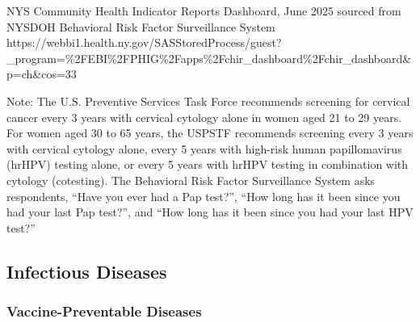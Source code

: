 \documentclass[
  english,
  letterpaper,
]{report}
\begin{document}
\begin{tcolorbox}[enhanced jigsaw, breakable, leftrule=.75mm, title=\textcolor{quarto-callout-note-color}{\faInfo}\hspace{0.5em}{Source}, bottomrule=.15mm, opacityback=0, left=2mm, colback=white, bottomtitle=1mm, coltitle=black, colbacktitle=quarto-callout-note-color!10!white, colframe=quarto-callout-note-color-frame, opacitybacktitle=0.6, toptitle=1mm, titlerule=0mm, arc=.35mm, rightrule=.15mm, toprule=.15mm]

NYS Community Health Indicator Reports Dashboard, June 2025 sourced from
NYSDOH Behavioral Risk Factor Surveillance System
https://webbi1.health.ny.gov/SASStoredProcess/guest?\_program=\%2FEBI\%2FPHIG\%2Fapps\%2Fchir\_dashboard\%2Fchir\_dashboard\&p=ch\&cos=33

\end{tcolorbox}

\begin{tcolorbox}[enhanced jigsaw, breakable, leftrule=.75mm, title=\textcolor{quarto-callout-note-color}{\faInfo}\hspace{0.5em}{Note}, bottomrule=.15mm, opacityback=0, left=2mm, colback=white, bottomtitle=1mm, coltitle=black, colbacktitle=quarto-callout-note-color!10!white, colframe=quarto-callout-note-color-frame, opacitybacktitle=0.6, toptitle=1mm, titlerule=0mm, arc=.35mm, rightrule=.15mm, toprule=.15mm]

Note: The U.S. Preventive Services Task Force recommends screening for
cervical cancer every 3 years with cervical cytology alone in women aged
21 to 29 years. For women aged 30 to 65 years, the USPSTF recommends
screening every 3 years with cervical cytology alone, every 5 years with
high-risk human papillomavirus (hrHPV) testing alone, or every 5 years
with hrHPV testing in combination with cytology (cotesting). The
Behavioral Risk Factor Surveillance System asks respondents, ``Have you
ever had a Pap test?'', ``How long has it been since you had your last
Pap test?'', and ``How long has it been since you had your last HPV
test?''

\end{tcolorbox}

\subsection{Infectious Diseases}\label{infectious-diseases}

\subsubsection{Vaccine-Preventable
Diseases}\label{vaccine-preventable-diseases}
\end{document}
